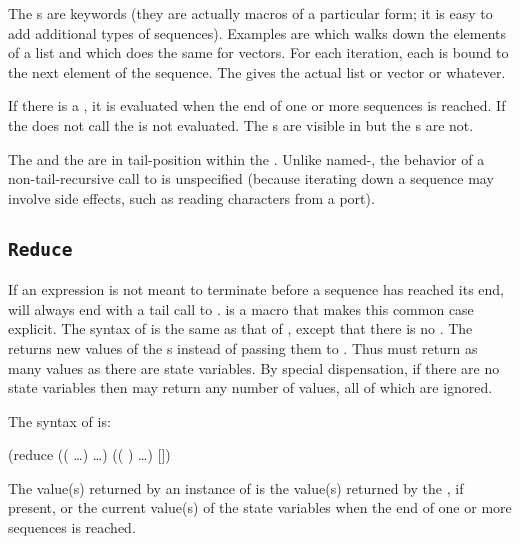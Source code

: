 The s are keywords (they are actually macros of a particular
 form; it is easy to add additional types of sequences).
Examples are  which walks down the elements of a list and
  which does the same for vectors.
For each iteration, each  is bound to the next
 element of the sequence.
The  gives the actual list or vector or whatever.

If there is a , it is evaluated when the end of one or more
 sequences is reached.
If the  does not call  the
  is not evaluated.
The s are visible in
  but the s are not.  

The  and the  are in tail-position within
 the .
Unlike named-, the behavior of a non-tail-recursive call to
  is unspecified (because iterating down a sequence may involve side
 effects, such as reading characters from a port).

\subsection{{\tt Reduce}}

If an  expression is not meant to terminate before a sequence
 has reached its end,
  will always end with a tail call to .
 is a macro that makes this common case explicit.
The syntax of  is
 the same as that of , except that there is no .
The  returns new values of the s
 instead of passing them to .
Thus  must return as many values as there are state
 variables.
By special dispensation, if there are
 no state variables then  may return any number of values,
 all of which are ignored.

The syntax of  is:
\begin{example}
  (reduce ((   \ldots)
            \ldots)
           (( )
            \ldots)
    [])
\end{example}

The value(s) returned by an instance of  is the value(s) returned
 by the , if present, or the current value(s) of the state
variables when the end of one or more sequences is reached.

